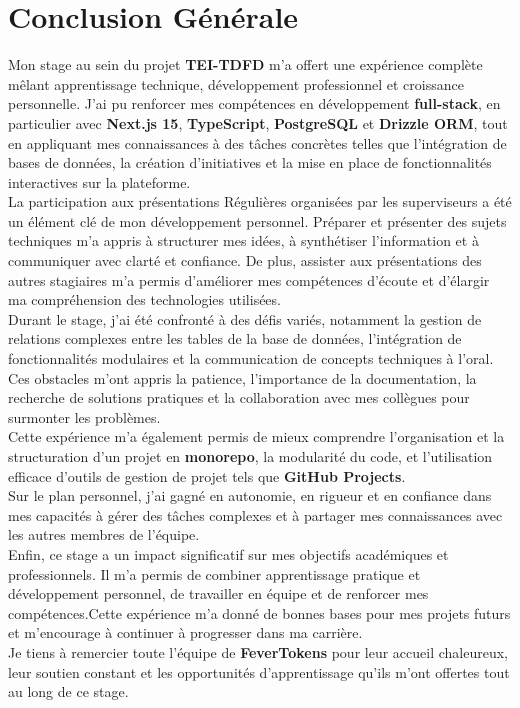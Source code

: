 \chapter*{Conclusion Générale}

Mon stage au sein du projet \textbf{TEI-TDFD} m'a offert une expérience complète mêlant apprentissage technique, développement professionnel et croissance personnelle. J'ai pu renforcer mes compétences en développement \textbf{full-stack}, en particulier avec \textbf{Next.js 15}, \textbf{TypeScript}, \textbf{PostgreSQL} et \textbf{Drizzle ORM}, tout en appliquant mes connaissances à des tâches concrètes telles que l'intégration de bases de données, la création d'initiatives et la mise en place de fonctionnalités interactives sur la plateforme.\\[.5cm]
La participation aux présentations Régulières organisées par les superviseurs a été un élément clé de mon développement personnel. Préparer et présenter des sujets techniques m'a appris à structurer mes idées, à synthétiser l'information et à communiquer avec clarté et confiance. De plus, assister aux présentations des autres stagiaires m'a permis d'améliorer mes compétences d'écoute et d'élargir ma compréhension des technologies utilisées.\\[.5cm]
Durant le stage, j'ai été confronté à des défis variés, notamment la gestion de relations complexes entre les tables de la base de données, l'intégration de fonctionnalités modulaires et la communication de concepts techniques à l'oral. Ces obstacles m'ont appris la patience, l'importance de la documentation, la recherche de solutions pratiques et la collaboration avec mes collègues pour surmonter les problèmes.\\
Cette expérience m'a également permis de mieux comprendre l'organisation et la structuration d'un projet en \textbf{monorepo}, la modularité du code, et l'utilisation efficace d'outils de gestion de projet tels que \textbf{GitHub Projects}.\\[2mm]
Sur le plan personnel, j'ai gagné en autonomie, en rigueur et en confiance dans mes capacités à gérer des tâches complexes et à partager mes connaissances avec les autres membres de l'équipe.\\[.5cm]
Enfin, ce stage a un impact significatif sur mes objectifs académiques et professionnels. Il m'a permis de combiner apprentissage pratique et développement personnel, de travailler en équipe et de renforcer mes compétences.Cette expérience m'a donné de bonnes bases pour mes projets futurs et m'encourage à continuer à progresser dans ma carrière.\\[.5cm]
Je tiens à remercier toute l'équipe de \textbf{\textcolor{ftRed}{FeverTokens}} pour leur accueil chaleureux, leur soutien constant et les opportunités d'apprentissage qu'ils m'ont offertes tout au long de ce stage.


